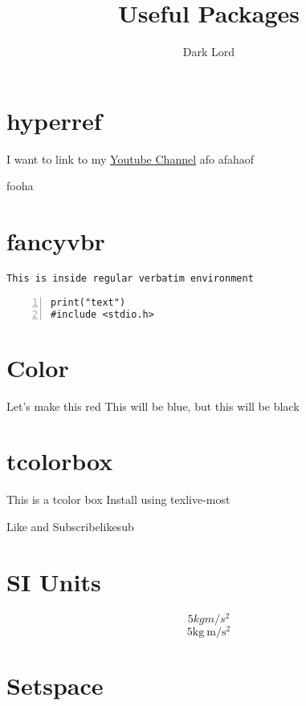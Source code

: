 \documentclass{report}
\title{Useful Packages}
\author{Dark Lord}
\begin{document}
\maketitle

\section{hyperref}
I want to link to my \href{https://www.youtube.com/watch?v=331YxgOJUGw&list=PLHXZ9OQGMqxcWWkx2DMnQmj5os2X5ZR73}{Youtube Channel}
afo
afahaof

fooha

\section{fancyvbr}

\begin{verbatim}
This is inside regular verbatim environment
\end{verbatim}

\begin{Verbatim}[numbers=left,frame=single,formatcom=\color{red}]
print("text")
#include <stdio.h>
\end{Verbatim}




\section{Color}

Let's make {\color{red} this} red
\color{blue}
This will be blue,
\color{black}
but this will be black

\section{tcolorbox}
\begin{tcolorbox}
This is a tcolor box 
Install using texlive-most
\end{tcolorbox}


\begin{tcolorbox}[colback=red!5!white,colframe=red!50!black,title=My Nice heading]


\end{tcolorbox}


\begin{theo}{Like and Subscribe}{likesub}


\end{theo}


\section{SI Units}

\[ 5 kg m /s^2 \]
\[5  \mathrm{kg}\ \mathrm{m}/\mathrm{s}^2 \]

\section{Setspace}

\lipsum[1-10]
\end{document}
